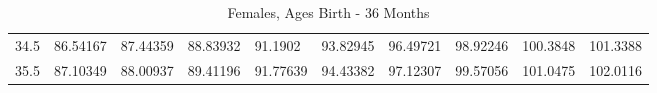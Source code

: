 \documentclass[10pt,twocolumn,letterpaper]{article}
\begin{document}
\begin{table}
{\begin{tabular}{llllllllll}
    34.5            & 86.54167                               & 87.44359                               & 88.83932                                & 91.1902                                 & 93.82945                                & 96.49721                                & 98.92246                                & 100.3848                                & 101.3388                                \\
    35.5            & 87.10349                               & 88.00937                               & 89.41196                                & 91.77639                                & 94.43382                                & 97.12307                                & 99.57056                                & 101.0475                                & 102.0116                                \\
    \end{tabular} }
    \caption {Females, Ages Birth - 36 Months}
		
\end{table}

\twocolumn
\begingroup
\nocite{*}
{\small


}
\endgroup
\end{document}

